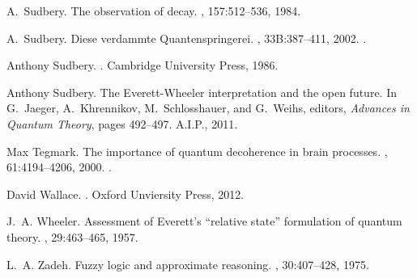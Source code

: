 \documentclass[12pt,a4paper,reqno]{article}
\renewcommand{\(}{\left(}
\renewcommand{\)}{\right)}
\newcommand{\<}{\langle}
\renewcommand{\>}{\rangle}
\theoremstyle{plain} %
\begin{document}
\begin{thebibliography}{10}
A.~Sudbery.
\newblock The observation of decay.
, 157:512--536, 1984.

A.~Sudbery.
\newblock Diese verdammte {Q}uantenspringerei.
, 33B:387--411, 2002.
.

Anthony Sudbery.
.
\newblock Cambridge University Press, 1986.

Anthony Sudbery.
\newblock The {E}verett-{W}heeler interpretation and the open future.
\newblock In G.~Jaeger, A.~Khrennikov, M.~Schlosshauer, and G.~Weihs, editors,
  {\em Advances in Quantum Theory}, pages 492--497. A.I.P., 2011.

Max Tegmark.
\newblock The importance of quantum decoherence in brain processes.
, 61:4194--4206, 2000.
.

David Wallace.
.
\newblock Oxford Unviersity Press, 2012.

J.~A. Wheeler.
\newblock Assessment of {E}verett's ``relative state'' formulation of quantum
  theory.
, 29:463--465, 1957.

L.~A. Zadeh.
\newblock Fuzzy logic and approximate reasoning.
, 30:407--428, 1975.

\end{thebibliography}




%   
%
\end{document}
